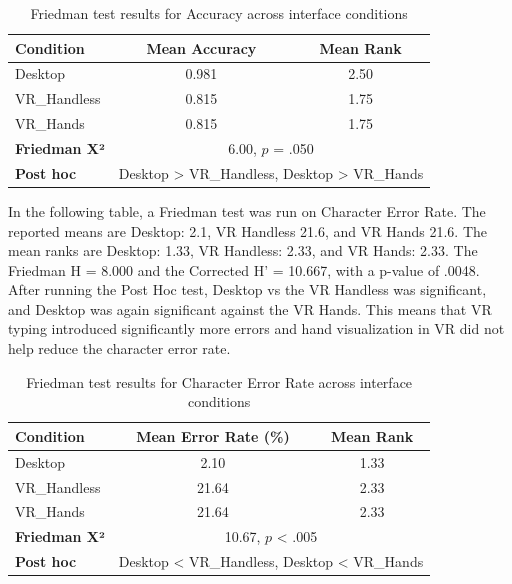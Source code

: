 \documentclass[acmlarge]{acmart}
\begin{document}
\begin{table}[ht]
\centering
\caption{Friedman test results for Accuracy across interface conditions}
\label{tab:accuracy_friedman}
\begin{tabular}{lcc}
\toprule
\textbf{Condition} & \textbf{Mean Accuracy} & \textbf{Mean Rank} \\
\midrule
Desktop     & 0.981  & 2.50 \\
VR\_Handless & 0.815  & 1.75 \\
VR\_Hands    & 0.815  & 1.75 \\
\midrule
\textbf{Friedman X²} & \multicolumn{2}{c}{6.00, $p$ = .050} \\
\textbf{Post hoc} & \multicolumn{2}{c}{Desktop > VR\_Handless, Desktop > VR\_Hands} \\
\bottomrule
\end{tabular}
\end{table}

In the following table, a Friedman test was run on Character Error Rate. The reported means are Desktop: 2.1, VR Handless 21.6, and VR Hands 21.6. The mean ranks are Desktop: 1.33, VR Handless: 2.33, and VR Hands: 2.33. The Friedman H = 8.000 and the Corrected H' = 10.667, with a p-value of .0048. After running the Post Hoc test, Desktop vs the VR Handless was significant, and Desktop was again significant against the VR Hands. This means that VR typing introduced significantly more errors and hand visualization in VR did not help reduce the character error rate. 

\begin{table}[ht]
\centering
\caption{Friedman test results for Character Error Rate across interface conditions}
\label{tab:error_friedman}
\begin{tabular}{lcc}
\toprule
\textbf{Condition} & \textbf{Mean Error Rate (\%)} & \textbf{Mean Rank} \\
\midrule
Desktop     & 2.10  & 1.33 \\
VR\_Handless & 21.64 & 2.33 \\
VR\_Hands    & 21.64 & 2.33 \\
\midrule
\textbf{Friedman X²} & \multicolumn{2}{c}{10.67, $p$ < .005} \\
\textbf{Post hoc} & \multicolumn{2}{c}{Desktop < VR\_Handless, Desktop < VR\_Hands} \\
\bottomrule
\end{tabular}
\end{table}
\end{document}
